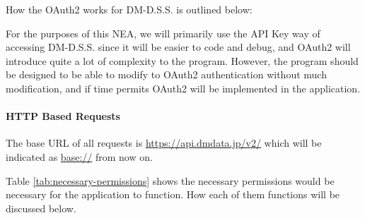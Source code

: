 How the OAuth2 works for DM-D.S.S. is outlined below:


For the purposes of this NEA, we will primarily use the API Key way of accessing DM-D.S.S. since it will be easier to code and debug, and OAuth2 will introduce quite a lot of complexity to the program. However, the program should be designed to be able to modify to OAuth2 authentication without much modification, and if time permits OAuth2 will be implemented in the application.

\paragraph{HTTP Based Requests}

The base URL of all requests is \url{https://api.dmdata.jp/v2/} which will be indicated as \url{base://} from now on.

Table \ref{tab:necessary-permissions} shows the necessary permissions would be necessary for the application to function. How each of them functions will be discussed below.

